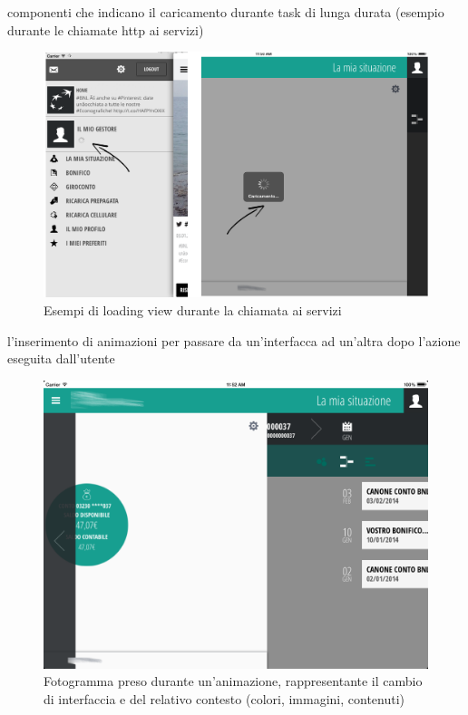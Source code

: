 componenti che indicano il caricamento durante task di lunga durata (esempio durante le chiamate http ai servizi)

\begin{figure}[htbp]
\centering
\includegraphics[scale=0.30]{ux/loading.png}
\caption{Esempi di loading view durante la chiamata ai servizi}
\end{figure}

l'inserimento di animazioni per passare da un'interfacca ad un'altra dopo l'azione eseguita dall'utente
\begin{figure}[htbp]
\centering
\includegraphics[scale=0.30]{ux/animazione.png}
\caption{Fotogramma preso durante un'animazione, rappresentante il cambio di interfaccia e del relativo contesto (colori, immagini, contenuti)}
\end{figure}


